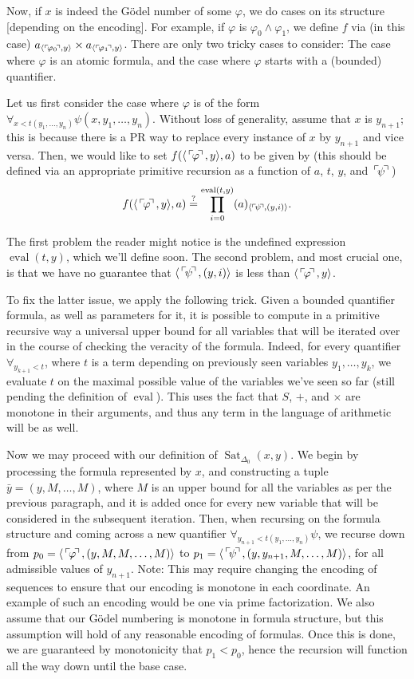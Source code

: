 \documentclass{article}
\theoremstyle{nonumberplain}
\DeclareMathOperator{\Sat}{Sat}
\DeclareMathOperator{\eval}{eval}
\DeclarePairedDelimiter{\braket}{\langle}{\rangle}
\newcommand{\gn}[1]{\setbox0=\hbox{$\mathclap{\phantom{t}}#1$} \dimen0=\ht0 \advance\dimen0 by -1.25ex \,\raise\dimen0\hbox{$\ulcorner$} \! \box0 \! \raise\dimen0\hbox{$\urcorner$}\,}
\newcommand{\ssgn}[1]{\ulcorner\!#1\!\urcorner}
\begin{document}
Now, if $x$ is indeed the Gödel number of some $\varphi$, we do cases on its structure [depending on the encoding]. For example, if $\varphi$ is $\varphi_0 \land \varphi_1$, we define $f$ via (in this case) $a_{\braket{\ssgn{\varphi_0}, y}} \times a_{\braket{\ssgn{\varphi_1}, y}}$. There are only two tricky cases to consider: The case where $\varphi$ is an atomic formula, and the case where $\varphi$ starts with a (bounded) quantifier.

Let us first consider the case where $\varphi$ is of the form $\forall_{x < t(y_1, \dots, y_n)} \psi(x, y_1, \dots, y_n)$. Without loss of generality, assume that $x$ is $y_{n+1}$; this is because there is a PR way to replace every instance of $x$ by $y_{n+1}$ and vice versa. Then, we would like to set $f(\braket{\gn\varphi, y},a)$ to be given by (this should be defined via an appropriate primitive recursion as a function of $a$, $t$, $y$, and $\gn\psi$)
\begin{equation}
f(\braket{\gn\varphi, y},a) \overset?= \prod_{i = 0}^{\eval(t,y)} (a)_{\braket{\ulcorner\!\psi\!\urcorner, (y, i)}}.
\end{equation}

The first problem the reader might notice is the undefined expression $\eval(t,y)$, which we'll define soon. The second problem, and most crucial one, is that we have no guarantee that $\braket{\gn\psi, (y,i)}$ is less than $\braket{\gn\varphi, y}$.

To fix the latter issue, we apply the following trick. Given a bounded quantifier formula, as well as parameters for it, it is possible to compute in a primitive recursive way a universal upper bound for all variables that will be iterated over in the course of checking the veracity of the formula. Indeed, for every quantifier $\forall_{y_{k+1} < t}$, where $t$ is a term depending on previously seen variables $y_1, \dots, y_k$, we evaluate $t$ on the maximal possible value of the variables we've seen so far (still pending the definition of $\eval$). This uses the fact that $S$, $+$, and $\times$ are monotone in their arguments, and thus any term in the language of arithmetic will be as well.

Now we may proceed with our definition of $\Sat_{\Delta_0}(x,y)$. We begin by processing the formula represented by $x$, and constructing a tuple $\bar y = (y,M,\dots, M)$, where $M$ is an upper bound for all the variables as per the previous paragraph, and it is added once for every new variable that will be considered in the subsequent iteration. Then, when recursing on the formula structure and coming across a new quantifier $\forall_{y_{n+1} < t(y_1, \dots, y_n)} \psi$, we recurse down from $p_0 = \braket{\gn\varphi, (y,M,M,\dots,M)}$ to $p_1 = \braket{\gn\psi, (y, y_{n+1}, M, \dots, M)}$, for all admissible values of $y_{n+1}$. Note: This may require changing the encoding of sequences to ensure that our encoding is monotone in each coordinate. An example of such an encoding would be one via prime factorization. We also assume that our Gödel numbering is monotone in formula structure, but this assumption will hold of any reasonable encoding of formulas. Once this is done, we are guaranteed by monotonicity that $p_1 < p_0$, hence the recursion will function all the way down until the base case.
\end{document}
